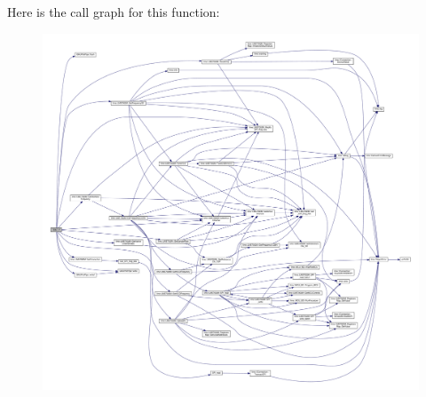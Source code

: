 Here is the call graph for this function\+:
\nopagebreak
\begin{figure}[H]
\begin{center}
\leavevmode
\includegraphics[width=350pt]{df/d7d/streaming_8cpp_a417856f37c9211136e6488f20b4ba5a7_cgraph}
\end{center}
\end{figure}


